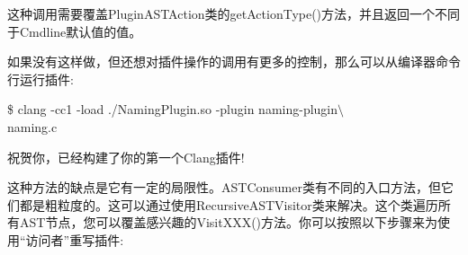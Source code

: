 这种调用需要覆盖PluginASTAction类的getActionType()方法，并且返回一个不同于Cmdline默认值的值。\par

如果没有这样做，但还想对插件操作的调用有更多的控制，那么可以从编译器命令行运行插件:\par

\begin{tcolorbox}[colback=white,colframe=black]
\$ clang -cc1 -load ./NamingPlugin.so -plugin naming-plugin$\setminus$ \\
\hspace*{0.5cm}naming.c
\end{tcolorbox}

祝贺你，已经构建了你的第一个Clang插件!\par

这种方法的缺点是它有一定的局限性。ASTConsumer类有不同的入口方法，但它们都是粗粒度的。这可以通过使用RecursiveASTVisitor类来解决。这个类遍历所有AST节点，您可以覆盖感兴趣的VisitXXX()方法。你可以按照以下步骤来为使用“访问者”重写插件:\par

